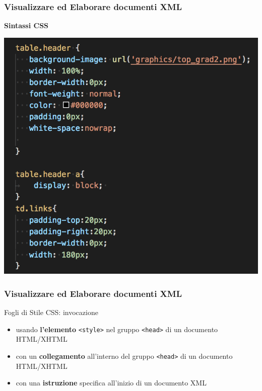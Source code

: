 \documentclass{beamer}
\begin{document}
    \begin{frame}
        \frametitle{Visualizzare ed Elaborare documenti XML}
        \addtocounter{nframe}{1}
        \begin{center}
            \textbf{Sintassi CSS}
        \end{center}
       
        \begin{center}
            \includegraphics[width=.8\textwidth]{imgs/css-sintassi.png}
        \end{center}
    
    \end{frame}

    \begin{frame}
        \frametitle{Visualizzare ed Elaborare documenti XML}
        \addtocounter{nframe}{1}
        \begin{block}{Fogli di Stile CSS: invocazione}
            
            \begin{itemize}
                \item usando \textbf{l’elemento} \texttt{<style>} nel gruppo \texttt{<head>} di un documento HTML/XHTML
                \item con un \textbf{collegamento} all’interno del gruppo \texttt{<head>} di un documento HTML/XHTML
                \item con una \textbf{istruzione} specifica all’inizio di un documento XML
            \end{itemize}
         \end{block}
    
    \end{frame}
\end{document}
